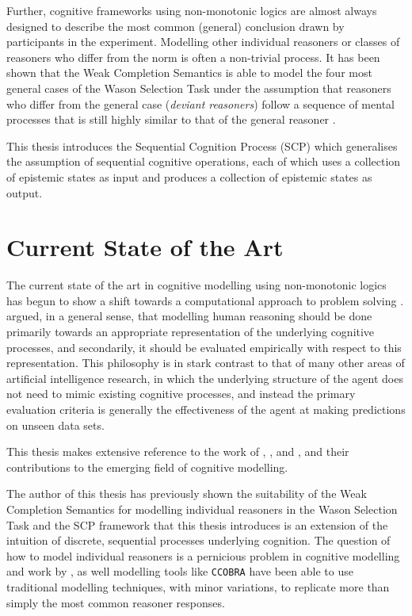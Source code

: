 Further, cognitive frameworks using non-monotonic logics are almost always designed to describe the most common (general) conclusion drawn by participants in the experiment. Modelling other individual reasoners or classes of reasoners who differ from the norm is often a non-trivial process. It has been shown that the Weak Completion Semantics \citep{holldobler2015weak} is able to model the four most general cases of the Wason Selection Task under the assumption that reasoners who differ from the general case (\textit{deviant reasoners}) follow a sequence of mental processes that is still highly similar to that of the general reasoner \citep{breu2019weak}.

This thesis introduces the Sequential Cognition Process (SCP) which generalises the assumption of sequential cognitive operations, each of which uses a collection of epistemic states as input and produces a collection of epistemic states as output. 

\section{Current State of the Art} \label{sec:soa}
The current state of the art in cognitive modelling using non-monotonic logics has begun to show a shift towards a computational approach to problem solving \citep{dietz2012computational}. \cite{stenning2012human} argued, in a general sense, that modelling human reasoning should be done primarily towards an appropriate representation of the underlying cognitive processes, and secondarily, it should be evaluated empirically with respect to this representation. This philosophy is in stark contrast to that of many other areas of artificial intelligence research, in which the underlying structure of the agent does not need to mimic existing cognitive processes, and instead the primary evaluation criteria is generally the effectiveness of the agent at making predictions on unseen data sets.

This thesis makes extensive reference to the work of \cite{dietz2012computational}, \cite{dietz2014modeling}, and \cite{ragni2017wason}, and their contributions to the emerging field of cognitive modelling. 

The author of this thesis has previously shown the suitability of the Weak Completion Semantics for modelling individual reasoners in the Wason Selection Task \citep{breu2019weak} and the SCP framework that this thesis introduces is an extension of the intuition of discrete, sequential processes underlying cognition. The question of how to model individual reasoners is a pernicious problem in cognitive modelling and work by \cite{breu2019weak}, as well modelling tools like \texttt{CCOBRA} \citep{ccobra} have been able to use traditional modelling techniques, with minor variations, to replicate more than simply the most common reasoner responses.



